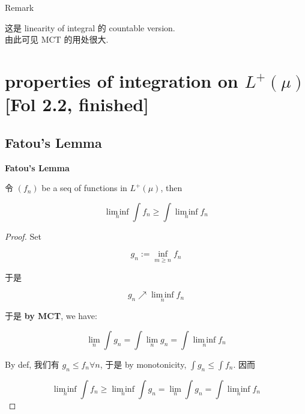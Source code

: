 \documentclass{qlnotes-export}
\begin{document}
\begin{qlremark}{Remark}

这是 linearity of integral 的 countable version.\\
由此可见 MCT 的用处很大.

\end{qlremark}

\section{\texorpdfstring{properties of integration on \(L^{+}(\mu)\) {[}Fol 2.2, finished{]}}{properties of integration on L\^{}\{+\}(\textbackslash mu) {[}Fol 2.2, finished{]}}}

\subsection{Fatou's Lemma}\label{fatous-lemma}

\begin{theorem}{\protect{}\label{kn-fatou-lemma}{\textbf{Fatou's Lemma}}}

令 \((f_{n})\) be a seq of functions in \(L^{+}(\mu)\), then

\[\operatorname{lim\, inf}\limits_{n}\int f_{n} \geq \int\operatorname{lim\, inf}\limits_{n}f_{n}\]

\end{theorem}

\begin{proof}

Set

\[g_{n} := \inf\limits_{m \geq n}f_{n}\]

于是

\[g_{n}\operatorname{\nearrow ︎}\operatorname{lim\, inf}\limits_{n}f_{n}\]

于是 \textbf{by MCT}, we have:

\[\lim\limits_{n}\int g_{n} = \int\lim\limits_{n}g_{n} = \int\operatorname{lim\, inf}\limits_{n}f_{n}\]

By def, 我们有 \(g_{n} \leq f_{n}\forall n\), 于是 by monotonicity, \(\int g_{n} \leq \int f_{n}\). 因而

\[\operatorname{lim\, inf}\limits_{n}\int f_{n} \geq \operatorname{lim\, inf}\limits_{n}\int g_{n} = \lim\limits_{n}\int g_{n} = \int\operatorname{lim\, inf}\limits_{n}f_{n}\]

\end{proof}
\end{document}
